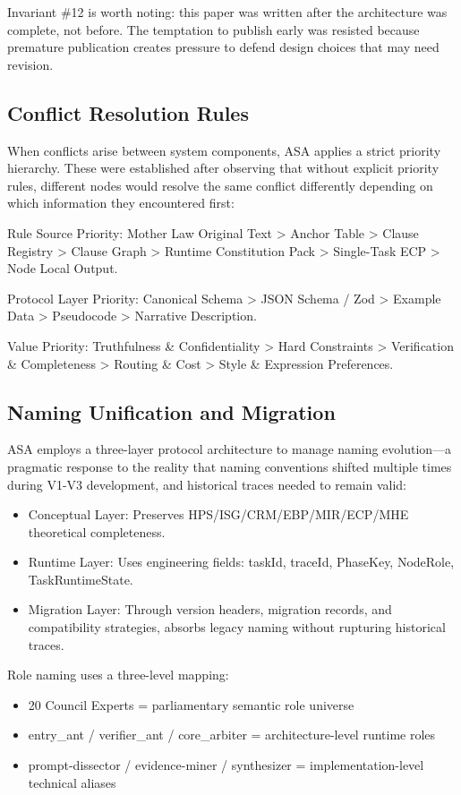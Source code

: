 \documentclass[12pt,a4paper]{article}
\begin{document}
Invariant \#12 is worth noting: this paper was written after the architecture was complete, not before. The temptation to publish early was resisted because premature publication creates pressure to defend design choices that may need revision.

\subsection{Conflict Resolution Rules}


When conflicts arise between system components, ASA applies a strict priority hierarchy. These were established after observing that without explicit priority rules, different nodes would resolve the same conflict differently depending on which information they encountered first:

Rule Source Priority:
Mother Law Original Text > Anchor Table > Clause Registry > Clause Graph > Runtime Constitution Pack > Single-Task ECP > Node Local Output.

Protocol Layer Priority:
Canonical Schema > JSON Schema / Zod > Example Data > Pseudocode > Narrative Description.

Value Priority:
Truthfulness \& Confidentiality > Hard Constraints > Verification \& Completeness > Routing \& Cost > Style \& Expression Preferences.

\subsection{Naming Unification and Migration}


ASA employs a three-layer protocol architecture to manage naming evolution---a pragmatic response to the reality that naming conventions shifted multiple times during V1-V3 development, and historical traces needed to remain valid:

\begin{itemize}
  \item Conceptual Layer: Preserves HPS/ISG/CRM/EBP/MIR/ECP/MHE theoretical completeness.
  \item Runtime Layer: Uses engineering fields: taskId, traceId, PhaseKey, NodeRole, TaskRuntimeState.
  \item Migration Layer: Through version headers, migration records, and compatibility strategies, absorbs legacy naming without rupturing historical traces.
\end{itemize}


Role naming uses a three-level mapping:
\begin{itemize}
  \item 20 Council Experts = parliamentary semantic role universe
  \item entry\_ant / verifier\_ant / core\_arbiter = architecture-level runtime roles
  \item prompt-dissector / evidence-miner / synthesizer = implementation-level technical aliases
\end{itemize}
\end{document}
